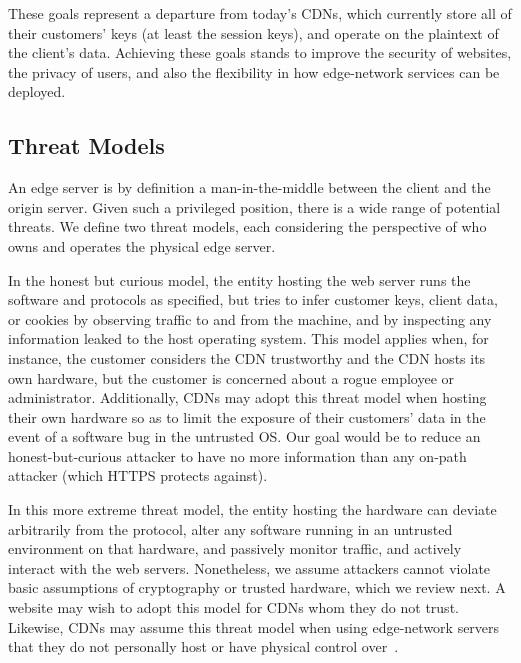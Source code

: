 These goals represent a departure from today's CDNs, which
currently store all of their customers' keys (at least the session
keys), and operate on the plaintext of the client's data.
%
Achieving these goals stands to improve the security of websites, the
privacy of users, and also the flexibility in how edge-network services
can be deployed.







\subsection{Threat Models} %

An edge server is by definition a man-in-the-middle between the client
and the origin server.
%
Given such a privileged position, there is a wide range of potential
threats.
%
We define two threat models, each considering the perspective of who
owns and operates the physical edge server.

%
In the honest but curious model, the entity hosting the web server runs
the software and protocols as specified, but tries to infer customer
keys, client data, or cookies by observing traffic to and from the
machine, and by inspecting any information leaked to the host
operating system.
%
This model applies when, for instance, the customer considers the CDN
trustworthy and the CDN hosts its own hardware, but the customer is
concerned about a rogue employee or administrator.
%
Additionally, CDNs may adopt this threat model when hosting their own
hardware so as to limit the exposure of their customers' data in the
event of a software bug in the untrusted OS.
%
Our goal would be to reduce an honest-but-curious attacker to have no
more information than any on-path attacker (which HTTPS protects
against).

%
In this more extreme threat model, the entity hosting the hardware can
deviate arbitrarily from the protocol, alter any software running in an
untrusted environment on that hardware, and passively monitor traffic,
and actively interact with the web servers.
%
Nonetheless, we assume attackers cannot violate basic assumptions of
cryptography or trusted hardware, which we review next.
%
A website may wish to adopt this model for CDNs whom they do not trust.
%
Likewise, CDNs may assume this threat model when using edge-network
servers that they do not personally host or have physical control
over~\cite{securing-cdns}.


